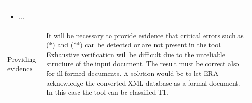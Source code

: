 \begin{longtable}{lp{}}
\begin{itemize}
                                  \item ...
                                \end{itemize}
                               \\
Providing evidence&It will be necessary to provide evidence that critical errors such as (*) and (**) can be detected or are not present in the tool. 
                   Exhaustive verification will be difficult due to the unreliable structure of the input document. The result must be correct
                   also for ill-formed documents. A solution would be to let ERA acknowledge the converted XML database as a formal document. In this case the tool can be classified T1.

\end{longtable}



